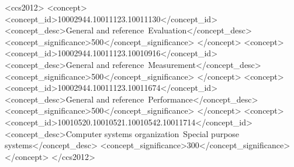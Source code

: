 \documentclass[sigconf,anonymous, authordraft]{acmart}
\begin{document}
\begin{CCSXML}
  <ccs2012>
     <concept>
         <concept_id>10002944.10011123.10011130</concept_id>
         <concept_desc>General and reference~Evaluation</concept_desc>
         <concept_significance>500</concept_significance>
         </concept>
     <concept>
         <concept_id>10002944.10011123.10010916</concept_id>
         <concept_desc>General and reference~Measurement</concept_desc>
         <concept_significance>500</concept_significance>
         </concept>
     <concept>
         <concept_id>10002944.10011123.10011674</concept_id>
         <concept_desc>General and reference~Performance</concept_desc>
         <concept_significance>500</concept_significance>
         </concept>
     <concept>
         <concept_id>10010520.10010521.10010542.10011714</concept_id>
         <concept_desc>Computer systems organization~Special purpose systems</concept_desc>
         <concept_significance>300</concept_significance>
         </concept>
   </ccs2012>
\end{CCSXML}
  

\keywords{}



\maketitle
\end{document}
